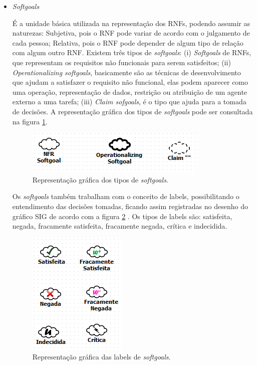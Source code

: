 \begin{itemize}
	\item \textit{Softgoals}
	
	É a unidade básica utilizada na representação dos RNFs, podendo assumir as naturezas: Subjetiva, pois o RNF pode variar de acordo com o julgamento de cada pessoa; Relativa, pois o RNF pode depender de algum tipo de relação com algum outro RNF. Existem três tipos de \textit{softgoals}: (i) \textit{Softgoals} de RNFs, que representam os requisitos não funcionais para serem satisfeitos; (ii) \textit{Operationalizing softgoals}, basicamente são as técnicas de desenvolvimento que ajudam a satisfazer o requisito não funcional, elas podem aparecer como uma operação, representação de dados, restrição ou atribuição de um agente externo a uma tarefa; (iii) \textit{Claim sofgoals}, é o tipo que ajuda para a tomada de decisões. A representação gráfica dos tipos de \textit{softgoals} pode ser consultada na figura \ref{fig01}.
	
	\begin{figure}[h]
		\centering
		\includegraphics[keepaspectratio=true,scale=0.9]{figuras/tiposDeSoftgoals.png}
		\caption{Representação gráfica dos tipos de \textit{softgoals}.}
		\label{fig01}
	\end{figure} 

	Os \textit{softgoals} também trabalham com o conceito de labels, possibilitando o entendimento das decisões tomadas, ficando assim registradas no desenho do gráfico SIG de acordo com  a figura \ref{fig02} . Os tipos de labels são: satisfeita, negada, fracamente satisfeita, fracamente negada, crítica e indecidida.
	

	\begin{figure}[h]
		\centering
		\includegraphics[keepaspectratio=true,scale=0.9]{figuras/labelsSoftgoals.png}
		\caption{Representação gráfica das labels de \textit{softgoals}.}
		\label{fig02}
	\end{figure} 


\end{itemize}
